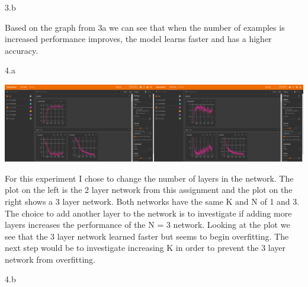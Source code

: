 \clearpage

\LARGE
3.b
\normalsize

\begin{answer}
	Based on the graph from 3a we can see that when the number of examples is increased performance improves, the model learns faster and has a higher accuracy.
\end{answer}

\clearpage

\LARGE
4.a
\normalsize

\begin{answer}
	\begin{center}
		\includegraphics[width=0.5\textwidth]{TwoLayer31}\includegraphics[width=0.5\textwidth]{ThreeLayer31}
	\end{center}
	For this experiment I chose to change the number of layers in the network. 
	The plot on the left is the 2 layer network from this assignment and the plot on the right shows a 3 layer network.
	Both networks have the same K and N of 1 and 3. 
	The choice to add another layer to the network is to investigate if adding more layers increases the performance of the N = 3 network. 
	Looking at the plot we see that the 3 layer network learned faster but seems to begin overfitting. The next step would be to investigate increasing K in order to prevent the 3 layer network from overfitting.
\end{answer}

\clearpage

\LARGE
4.b
\normalsize

